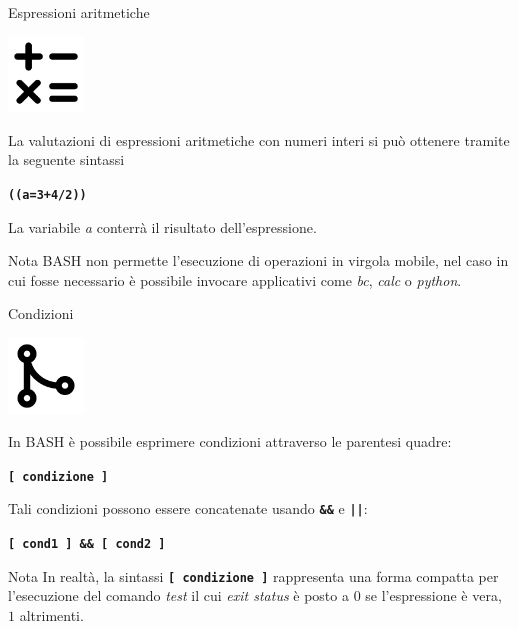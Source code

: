 \documentclass{beamer}
\begin{document}
    \begin{frame}{Espressioni aritmetiche}
        \begin{center}
            \includegraphics[height=2cm, keepaspectratio]{images/arithmetic.pdf}
        \end{center}
        La valutazioni di espressioni aritmetiche con numeri interi si può
        ottenere tramite la seguente sintassi

        \begin{center}
            \texttt{\textbf{((a=3+4/2))}}
        \end{center}

        La variabile \textit{a} conterrà il risultato dell'espressione.

        \begin{alertblock}{Nota}
            BASH non permette l'esecuzione di operazioni in virgola mobile, nel caso
            in cui fosse necessario è possibile invocare applicativi come \textit{bc}, \textit{calc} o \textit{python}.
        \end{alertblock}
    \end{frame}

    \begin{frame}{Condizioni}
        \begin{center}
            \includegraphics[height=2cm]{images/if.pdf}
        \end{center}

        In BASH è possibile esprimere condizioni attraverso le parentesi
        quadre:
        \begin{center}
            \texttt{\textbf{[ condizione ]}}
        \end{center}

        Tali condizioni possono essere concatenate usando \texttt{\textbf{\&\&}} e \texttt{\textbf{||}}:

        \begin{center}
            \texttt{\textbf{[ cond1 ] \&\& [ cond2 ]}}
        \end{center}

        \begin{alertblock}{Nota}
            \small
            In realtà, la sintassi \texttt{\textbf{[ condizione ]}} rappresenta
            una forma compatta per l'esecuzione del comando \textit{test} il cui \textit{exit status} è
            posto a $0$ se l'espressione è vera, $1$ altrimenti.
        \end{alertblock}
        \end{frame}
\end{document}
